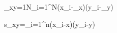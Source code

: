 \sigma_{xy}=\frac1N\sum_{i=1}^N(x_i-\mu_x)(y_i-\mu_y)

s_{xy}=\sum_{i=1}^n(x_i-\overline x)(y_i-\overline y)
